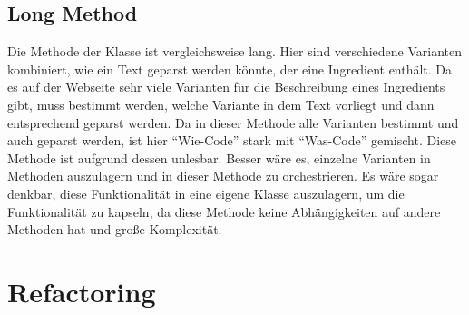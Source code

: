 \subsection{Long Method}
Die Methode \href{https://github.com/anditru/quickie/blob/bb41442c7f1ffbfcd3117cd86a40f7932e543a33/0-quickie-plugin-scraper/src/main/java/org/pinkcrazyunicorn/quickie/plugins/scraper/HensslerScraper.java#L100}{} der Klasse \href{https://github.com/anditru/quickie/blob/bb41442c7f1ffbfcd3117cd86a40f7932e543a33/0-quickie-plugin-scraper/src/main/java/org/pinkcrazyunicorn/quickie/plugins/scraper/HensslerScraper.java}{} ist vergleichsweise lang. Hier sind verschiedene Varianten kombiniert, wie ein Text geparst werden könnte, der eine Ingredient enthält. Da es auf der Webseite sehr viele Varianten für die Beschreibung eines Ingredients gibt, muss bestimmt werden, welche Variante in dem Text vorliegt und dann entsprechend geparst werden. Da in dieser Methode alle Varianten bestimmt und auch geparst werden, ist hier \enquote{Wie-Code} stark mit \enquote{Was-Code} gemischt. Diese Methode ist aufgrund dessen unlesbar. Besser wäre es, einzelne Varianten in Methoden auszulagern und in dieser Methode zu orchestrieren. Es wäre sogar denkbar, diese Funktionalität in eine eigene Klasse auszulagern, um die Funktionalität zu kapseln, da diese Methode keine Abhängigkeiten auf andere Methoden hat und große Komplexität.

\section{Refactoring}
%


